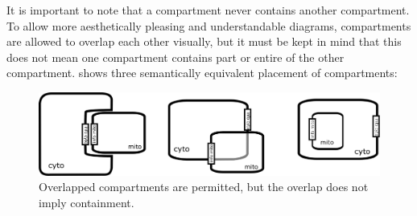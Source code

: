 



It is important to note that a compartment never contains another compartment. To allow more aesthetically pleasing and understandable diagrams, compartments are allowed to overlap each other visually, but it must be kept in mind that this does not mean one compartment contains part or entire of the other compartment.   shows three semantically equivalent placement of compartments:

\begin{figure}[H]
  \centering
  \includegraphics[scale = 0.4]{examples/compartment_overlapping.png}
  \caption{Overlapped compartments are permitted, but the overlap does not imply containment.}
  \label{fig:overlap}
\end{figure}

